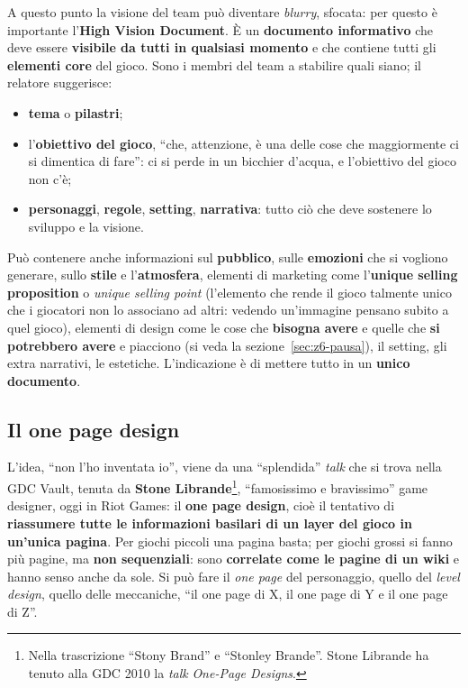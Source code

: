 A questo punto la visione del team può diventare \emph{blurry}, sfocata: per
questo è importante l'\textbf{High Vision Document}. È un \textbf{documento
informativo} che deve essere \textbf{visibile da tutti in qualsiasi momento} e
che contiene tutti gli \textbf{elementi core} del gioco. Sono i membri del team a
stabilire quali siano; il relatore suggerisce:
\begin{itemize}
  \item \textbf{tema} o \textbf{pilastri};
  \item l'\textbf{obiettivo del gioco}, ``che, attenzione, è una delle cose che
        maggiormente ci si dimentica di fare'': ci si perde in un bicchier
        d'acqua, e l'obiettivo del gioco non c'è;
  \item \textbf{personaggi}, \textbf{regole}, \textbf{setting},
        \textbf{narrativa}: tutto ciò che deve sostenere lo sviluppo e la
        visione.
\end{itemize}
Può contenere anche informazioni sul \textbf{pubblico}, sulle \textbf{emozioni}
che si vogliono generare, sullo \textbf{stile} e l'\textbf{atmosfera}, elementi di
marketing come l'\textbf{unique selling proposition} o \emph{unique selling
point} (l'elemento che rende il gioco talmente unico che i giocatori non lo
associano ad altri: vedendo un'immagine pensano subito a quel gioco), elementi
di design come le cose che \textbf{bisogna avere} e quelle che \textbf{si
potrebbero avere} e piacciono (si veda la sezione~\ref{sec:z6-pausa}), il
setting, gli extra narrativi, le estetiche. L'indicazione è di mettere tutto in
un \textbf{unico documento}.

\subsection{Il one page design}
\label{subsec:z6-one-page}

L'idea, ``non l'ho inventata io'', viene da una ``splendida'' \emph{talk} che si
trova nella GDC Vault, tenuta da \textbf{Stone Librande}\footnote{Nella
trascrizione ``Stony Brand'' e ``Stonley Brande''. Stone Librande ha tenuto alla
GDC 2010 la \emph{talk} \emph{One-Page Designs}.}, ``famosissimo e bravissimo''
game designer, oggi in Riot Games: il \textbf{one page design}, cioè il tentativo
di \textbf{riassumere tutte le informazioni basilari di un layer del gioco in
un'unica pagina}. Per giochi piccoli una pagina basta; per giochi grossi si
fanno più pagine, ma \textbf{non sequenziali}: sono \textbf{correlate come le
pagine di un wiki} e hanno senso anche da sole. Si può fare il \emph{one page}
del personaggio, quello del \emph{level design}, quello delle meccaniche, ``il
one page di X, il one page di Y e il one page di Z''.

